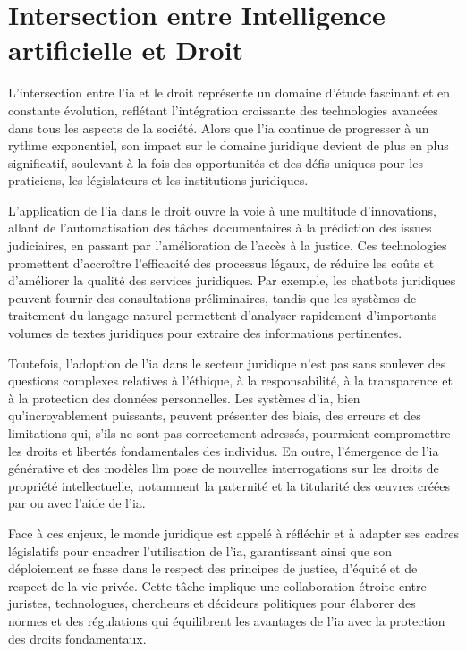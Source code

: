 \newpage
\section{Intersection entre Intelligence artificielle et Droit}

L'intersection entre l'\acf{ia} et le droit représente un domaine d'étude fascinant et en constante évolution, reflétant l'intégration croissante des technologies avancées dans tous les aspects de la société. Alors que l'\ac{ia} continue de progresser à un rythme exponentiel, son impact sur le domaine juridique devient de plus en plus significatif, soulevant à la fois des opportunités et des défis uniques pour les praticiens, les législateurs et les institutions juridiques.

L'application de l'\ac{ia} dans le droit ouvre la voie à une multitude d'innovations, allant de l'automatisation des tâches documentaires à la prédiction des issues judiciaires, en passant par l'amélioration de l'accès à la justice. Ces technologies promettent d'accroître l'efficacité des processus légaux, de réduire les coûts et d'améliorer la qualité des services juridiques. Par exemple, les chatbots juridiques peuvent fournir des consultations préliminaires, tandis que les systèmes de traitement du langage naturel permettent d'analyser rapidement d'importants volumes de textes juridiques pour extraire des informations pertinentes.

Toutefois, l'adoption de l'\ac{ia} dans le secteur juridique n'est pas sans soulever des questions complexes relatives à l'éthique, à la responsabilité, à la transparence et à la protection des données personnelles. Les systèmes d'\ac{ia}, bien qu'incroyablement puissants, peuvent présenter des biais, des erreurs et des limitations qui, s'ils ne sont pas correctement adressés, pourraient compromettre les droits et libertés fondamentales des individus. En outre, l'émergence de l'\ac{ia} générative et des modèles \ac{llm} pose de nouvelles interrogations sur les droits de propriété intellectuelle, notamment la paternité et la titularité des œuvres créées par ou avec l'aide de l'\ac{ia}.

Face à ces enjeux, le monde juridique est appelé à réfléchir et à adapter ses cadres législatifs pour encadrer l'utilisation de l'\ac{ia}, garantissant ainsi que son déploiement se fasse dans le respect des principes de justice, d'équité et de respect de la vie privée. Cette tâche implique une collaboration étroite entre juristes, technologues, chercheurs et décideurs politiques pour élaborer des normes et des régulations qui équilibrent les avantages de l'\ac{ia} avec la protection des droits fondamentaux.

